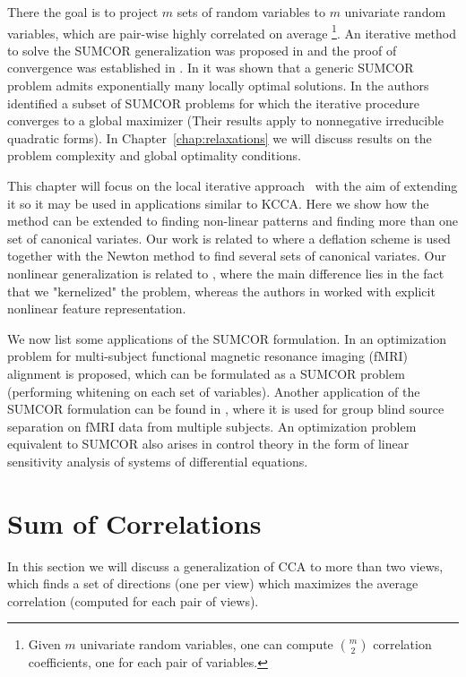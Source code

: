 There the goal is to project $m$ sets of random variables to $m$ univariate random variables,
which are pair-wise highly correlated on average
\footnote{Given $m$ univariate random variables, one can compute $\binom{m}{2}$ correlation
coefficients, one for each pair of variables.}.
An iterative method to solve the SUMCOR generalization was proposed in \cite{Horst}
and the proof of convergence was established in \cite{Chu}. In \cite{Chu} it was shown
that a generic SUMCOR problem admits exponentially many locally optimal solutions.
In \cite{GlobalMEP2} the authors identified a subset of SUMCOR problems for which the iterative
procedure converges to a global maximizer (Their results apply to nonnegative irreducible quadratic forms).
In Chapter~\ref{chap:relaxations} we will discuss results on the problem complexity and global optimality
conditions.

This chapter will focus on the local iterative approach~\cite{Horst} with the aim of extending it
so it may be used in applications similar to KCCA.
Here we show how the method can be extended to finding non-linear patterns and finding more than one
set of canonical variates. Our work is related to \cite{JointBSSAppl} where a deflation scheme
is used together with the Newton method to find several sets of canonical variates.
Our nonlinear generalization is related to \cite{nonlinJointBSS}, where the main difference
lies in the fact that we "kernelized" the problem, whereas the authors in \cite{nonlinJointBSS}
worked with explicit nonlinear feature representation.

We now list some applications of the SUMCOR formulation. In \cite{kernelHyperAppl} an optimization
problem for multi-subject functional magnetic resonance imaging (fMRI) alignment is proposed,
which can be formulated as a SUMCOR problem (performing whitening on each set of variables).
Another application of the SUMCOR formulation can be found in \cite{JointBSSAppl},
where it is used for group blind source separation on fMRI data from multiple subjects.
An optimization problem equivalent to SUMCOR also arises in control theory \cite{ControlApplication}
in the form of linear sensitivity analysis of systems of differential equations.

\section{Sum of Correlations}\label{chap:extensions:sumcor}

In this section we will discuss a generalization of CCA to more than two views,
which finds a set of directions (one per view) which maximizes the average correlation
(computed for each pair of views).

